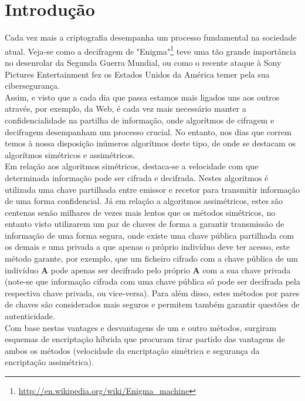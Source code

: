 \documentclass[a4paper,11pt,openright,oneside]{report}
\begin{document}
\tableofcontents
\listoffigures

\clearpage
{}

\chapter{Introdução}
\label{chap.introdução}

Cada vez mais a criptografia desempanha um processo fundamental na sociedade atual. Veja-se como a decifragem de "Enigma"\footnote{\url{http://en.wikipedia.org/wiki/Enigma_machine}} teve uma tão grande importância no desenrolar da Segunda Guerra Mundial, ou como o recente ataque à Sony Pictures Entertainment fez os Estados Unidos da América temer pela sua cibersegurança.\\

Assim, e visto que a cada dia que passa estamos mais ligados uns aos outros através, por exemplo, da Web, é cada vez mais necessário manter a confidencialidade na partilha de informação, onde algorítmos de cifragem e decifragem desempanham um processo crucial. No entanto, nos dias que correm temos à nossa disposição inúmeros algorítmos deste tipo, de onde se destacam os algorítmos simétricos e assimétricos.\\

Em relação aos algoritmos simétricos, destaca-se a velocidade com que determinada informação pode ser cifrada e decifrada. Nestes algoritmos é utilizada uma chave partilhada entre emissor e recetor para transmitir informação de uma forma confidencial. Já em relação a algoritmos assimétricos, estes são centenas senão milhares de vezes mais lentos que os métodos simétricos, no entanto visto utilizarem um par de chaves de forma a garantir transmissão de informação de uma forma segura, onde existe uma chave pública partilhada com os demais e uma privada a que apenas o próprio indivíduo deve ter acesso, este método garante, por exemplo, que um ficheiro cifrado com a chave pública de um indivíduo \textbf{A} pode apenas ser decifrado pelo próprio \textbf{A} com a sua chave privada (note-se que informação cifrada com uma chave pública só pode ser decifrada pela respectiva chave privada, ou vice-versa). Para além disso, estes métodos por pares de chaves são considerados mais seguros e permitem também garantir questões de autenticidade.\\

Com base nestas vantages e desvantagens de um e outro métodos, surgiram esquemas de encriptação híbrida que procuram tirar partido das vantagens de ambos os métodos (velocidade da encriptação simétrica e segurança da encriptação assimétrica).
\end{document}
